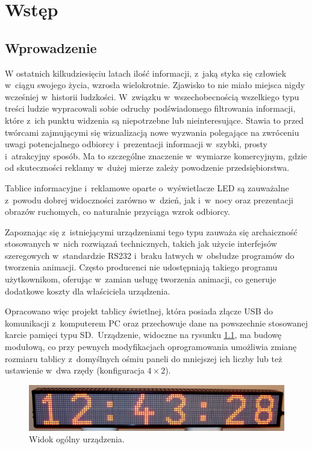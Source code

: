 \chapter{Wstęp}

\section{Wprowadzenie}

W ostatnich kilkudziesięciu latach ilość informacji, z~jaką styka się człowiek w~ciągu swojego życia, wzrosła wielokrotnie. Zjawisko to nie miało miejsca nigdy wcześniej w~historii ludzkości. W~związku w~wszechobecnością wszelkiego typu treści ludzie wypracowali sobie odruchy podświadomego filtrowania informacji, które z~ich punktu widzenia są niepotrzebne lub nieinteresujące. Stawia to przed twórcami zajmującymi się wizualizacją nowe wyzwania polegające na zwróceniu uwagi potencjalnego odbiorcy i~prezentacji informacji w~szybki, prosty i~atrakcyjny sposób. Ma to szczególne znaczenie w~wymiarze komercyjnym, gdzie od skuteczności reklamy w~dużej mierze zależy powodzenie przedsiębiorstwa.

Tablice informacyjne i~reklamowe oparte o~wyświetlacze LED są zauważalne z~powodu dobrej widoczności zarówno w~dzień, jak i~w~nocy oraz prezentacji obrazów ruchomych, co naturalnie przyciąga wzrok odbiorcy.

Zapoznając się z~istniejącymi urządzeniami tego typu zauważa się archaiczność stosowanych w~nich rozwiązań technicznych, takich jak użycie interfejsów szeregowych w~standardzie RS232 i~braku łatwych w~obsłudze programów do tworzenia animacji. Często producenci nie udostępniają takiego programu użytkownikom, oferując w~zamian usługę tworzenia animacji, co generuje dodatkowe koszty dla właściciela urządzenia.

Opracowano więc projekt tablicy świetlnej, która posiada złącze USB do komunikacji z~komputerem PC oraz przechowuje dane na powszechnie stosowanej karcie pamięci typu SD.~Urządzenie, widoczne na rysunku \ref{zdj-calosc}, ma budowę modułową, co przy pewnych modyfikacjach oprogramowania umożliwia zmianę rozmiaru tablicy z~domyślnych ośmiu paneli do mniejszej ich liczby lub też ustawienie w~dwa rzędy (konfiguracja $4 \times 2$).

\begin{figure}[htb]
	\begin{center}
		\includegraphics[width=\textwidth]{figures/overall.jpg}
	\end{center}
	\caption{Widok ogólny urządzenia.}
	\label{zdj-calosc}
\end{figure}

